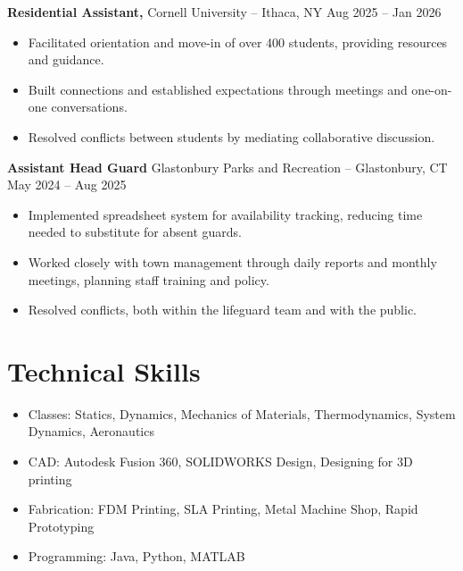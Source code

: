 \documentclass[12pt]{article}       %
\begin{document}
\textbf{Residential Assistant,} {Cornell University} -- Ithaca, NY \hfill Aug 2025 -- Jan 2026
\\
\vspace{-9pt}
\begin{itemize}
      \item Facilitated orientation and move-in of over 400 students, providing resources
            and guidance.
      \item Built connections and established expectations through meetings and one-on-one
            conversations.
      \item Resolved conflicts between students by mediating collaborative discussion.
\end{itemize}
\textbf{Assistant Head Guard} {Glastonbury Parks and Recreation} -- Glastonbury, CT \hfill May 2024 -- Aug 2025 \\
\vspace{-9pt}
\begin{itemize}
      \item Implemented spreadsheet system for availability tracking, reducing time needed
            to substitute for absent guards.
      \item Worked closely with town management through daily reports and monthly meetings,
            planning staff training and policy.
      \item Resolved conflicts, both within the lifeguard team and with the public.
\end{itemize}

\vspace{-18.5pt}

\section*{Technical Skills}
\begin{itemize}
      \item Classes: Statics, Dynamics, Mechanics of Materials, Thermodynamics, System Dynamics, Aeronautics
      \item CAD: Autodesk Fusion 360, SOLIDWORKS Design, Designing for 3D printing
      \item Fabrication: FDM Printing, SLA Printing, Metal Machine Shop, Rapid Prototyping
      \item Programming: Java, Python, MATLAB
\end{itemize}
\vspace{-18.5pt}
\end{document}
